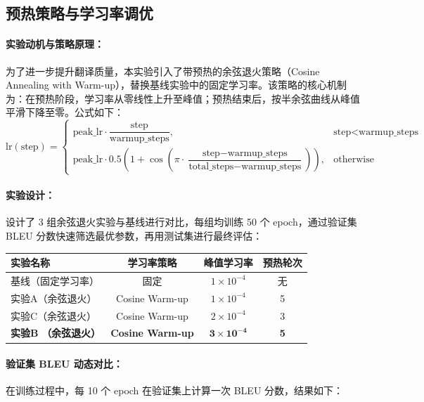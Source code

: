 \documentclass[11pt,a4paper]{article}
\begin{document}
\subsection{预热策略与学习率调优}

\paragraph{实验动机与策略原理：}
为了进一步提升翻译质量，本实验引入了带预热的余弦退火策略（Cosine Annealing with Warm-up），替换基线实验中的固定学习率。该策略的核心机制为：在预热阶段，学习率从零线性上升至峰值；预热结束后，按半余弦曲线从峰值平滑下降至零。公式如下：
\[
\mathrm{lr}(\text{step}) =
\begin{cases}
\mathrm{peak\_lr} \cdot \dfrac{\text{step}}{\text{warmup\_steps}}, & \text{step} < \text{warmup\_steps} \\[6pt]
\mathrm{peak\_lr} \cdot 0.5 \left(1 + \cos\left(\pi \cdot \dfrac{\text{step} - \text{warmup\_steps}}{\text{total\_steps} - \text{warmup\_steps}}\right)\right), & \text{otherwise}
\end{cases}
\]

\paragraph{实验设计：}
设计了 3 组余弦退火实验与基线进行对比，每组均训练 50 个 epoch，通过验证集 BLEU 分数快速筛选最优参数，再用测试集进行最终评估：

\begin{table}[h]
\centering
\begin{tabular}{lccc}
\toprule
实验名称 & 学习率策略 & 峰值学习率 & 预热轮次 \\
\midrule
基线（固定学习率） & 固定 & $1\times 10^{-4}$ & 无 \\
实验A（余弦退火） & Cosine Warm-up & $1\times 10^{-4}$ & 5 \\
实验C（余弦退火） & Cosine Warm-up & $2\times 10^{-4}$ & 3 \\
\textbf{实验B} \textbf{（余弦退火）} & \textbf{Cosine Warm-up} & $\mathbf{3\times 10^{-4}}$ & \textbf{5} \\
\bottomrule
\end{tabular}
\end{table}

\paragraph{验证集 BLEU 动态对比：}
在训练过程中，每 10 个 epoch 在验证集上计算一次 BLEU 分数，结果如下：
\end{document}
